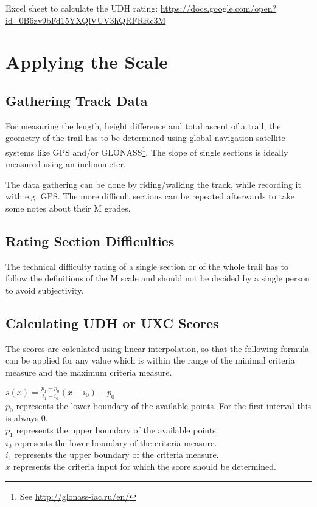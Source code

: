 \documentclass[a4paper,oneside]{scrartcl}
\begin{document}
Excel sheet to calculate the UDH rating: \url{https://docs.google.com/open?id=0B6zv9bFd15YXQlVUV3hQRFRRc3M}


\section{Applying the Scale}

\subsection{Gathering Track Data}
For measuring the length, height difference and total ascent of a trail, the
geometry of the trail has to be determined using global navigation satellite
systems like GPS and/or GLONASS\footnote{See \url{http://glonass-iac.ru/en/}}.
The slope of single sections is ideally measured using an inclinometer.

The data gathering can be done by riding/walking the track, while recording it
with e.g. GPS. The more difficult sections can be repeated afterwards to take
some notes about their M grades.

\subsection{Rating Section Difficulties}
The technical difficulty rating of a single section or of the whole trail has to
follow the definitions of the M scale and should not be decided by a single
person to avoid subjectivity.


\subsection{Calculating UDH or UXC Scores}
The scores are calculated using linear interpolation, so that the following formula can be applied for any value which is
within the range of the minimal criteria measure and the maximum criteria measure.

$s(x) = \frac{p_1 - p_0}{i_1 - i_0} (x - i_0) + p_0$\\
%
$p_0$ represents the lower boundary of the available points. For the first interval this is always 0.\\
$p_1$ represents the upper boundary of the available points.\\
$i_0$ represents the lower boundary of the criteria measure.\\
$i_1$ represents the upper boundary of the criteria measure.\\
$x$ represents the criteria input for which the score should be determined.\\
\end{document}
